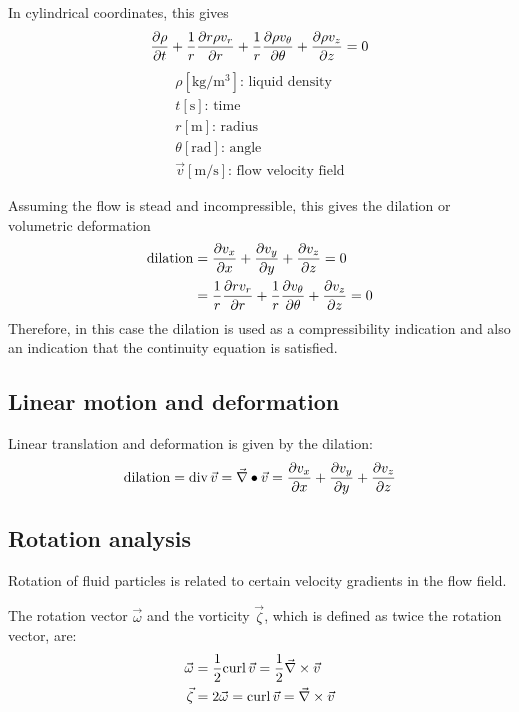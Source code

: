 \documentclass[10pt, twocolumn]{article}
\begin{document}
In cylindrical coordinates, this gives
\[
  \frac{\partial \rho}{\partial t} + \frac{1}{r}\frac{\partial r \rho v_r}{\partial r} + \frac{1}{r} \frac{\partial \rho v_\theta}{\partial \theta} + \frac{\partial \rho v_z}{\partial z} = 0
\]
\[
  \begin{array}{|l}
    \rho [\si{\kilogram\per\metre\cubed}] \text{: liquid density} \\
    t [\si{\second}] \text{: time}                                \\
    r [\si{\metre}] \text{: radius}                               \\
    \theta [\si{\radian}] \text{: angle}                          \\
    \vec{v} [\si{\metre\per\second}] \text{: flow velocity field}
  \end{array}
\]

\begin{remark}
  Assuming the flow is stead and incompressible, this gives the dilation or volumetric deformation
  \begin{align*}
    \mathrm{dilation} & = \frac{\partial v_x}{\partial x} + \frac{\partial v_y}{\partial y} + \frac{\partial v_z}{\partial z} = 0                                    \\
                      & = \frac{1}{r}\frac{\partial r v_r}{\partial r} + \frac{1}{r} \frac{\partial v_\theta}{\partial \theta} + \frac{\partial v_z}{\partial z} = 0
  \end{align*}
  Therefore, in this case the dilation is used as a compressibility indication and also an indication that the continuity equation is satisfied.
\end{remark}


\subsection{Linear motion and deformation}
Linear translation and deformation is given by the dilation:
\[
  \mathrm{dilation} = \mathrm{div}\,\vec{v} = \vec{\nabla} \bullet \vec{v} = \frac{\partial v_x}{\partial x} + \frac{\partial v_y}{\partial y} + \frac{\partial v_z}{\partial z}
\]


\subsection{Rotation analysis}
Rotation of fluid particles is related to certain velocity gradients in the flow field.

The rotation vector \(\vec{\omega}\) and the vorticity \(\vec{\zeta}\), which is defined as twice the rotation vector, are:
\begin{align*}
  \vec{\omega} & = \frac{1}{2} \mathrm{curl}\,\vec{v} = \frac{1}{2} \vec{\nabla} \times \vec{v} \\
  \vec{\zeta}  & = 2\vec{\omega} = \mathrm{curl}\,\vec{v} = \vec{\nabla} \times \vec{v}
\end{align*}
\end{document}

